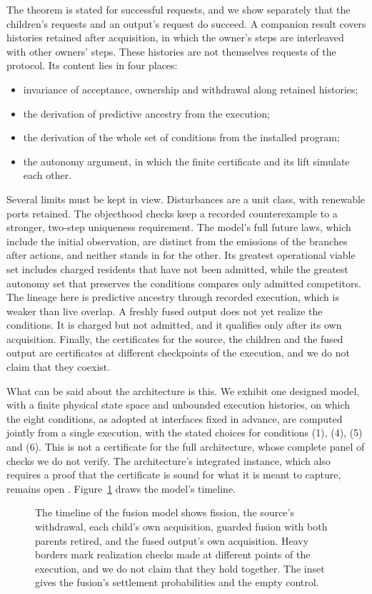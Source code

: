 The theorem is stated for successful requests, and we show separately that the
children's requests and an output's request do succeed. A companion result
covers histories retained after acquisition, in which the owner's steps are
interleaved with other owners' steps. These histories are not themselves
requests of the protocol. Its content lies in
four places:
\begin{itemize}
\item invariance of acceptance, ownership and withdrawal along retained
histories;
\item the derivation of predictive ancestry from the execution;
\item the derivation of the whole set of conditions from the installed
program;
\item the autonomy argument, in which the finite certificate and its lift
simulate each other.
\end{itemize}

Several limits must be kept in view. Disturbances are a unit class, with
renewable ports retained. The objecthood checks keep a recorded counterexample
to a stronger, two-step uniqueness requirement. The model's full future laws,
which include the initial observation, are distinct from the emissions of the
branches after actions, and neither stands in for the other. Its greatest
operational viable set includes charged residents that have not been
admitted, while the greatest autonomy set that preserves the conditions
compares only admitted competitors. The lineage here is predictive ancestry
through recorded execution, which is weaker than live overlap. A freshly fused
output does not yet realize the conditions. It is charged but not admitted,
and it qualifies only after its own acquisition. Finally, the certificates for
the source, the children and the fused output are certificates at different
checkpoints of the execution, and we do not claim that they coexist.

What can be said about the architecture is this. We exhibit one designed
model, with a finite physical state space and unbounded execution histories,
on which the eight conditions, as adopted at interfaces fixed in advance, are
computed jointly from a single execution, with the stated choices for
conditions (1), (4), (5) and (6). This is not a certificate for the full
architecture, whose complete panel of checks we do not verify. The
architecture's integrated instance, which also requires a proof that the
certificate is sound for what it is meant to capture, remains open
\citep{TsiokosArchitecture2026}. Figure~\ref{fig:fusion} draws the model's
timeline.

\begin{figure}[tbp]
\centering

\caption{The timeline of the fusion model shows fission, the source's withdrawal, each child's own acquisition, guarded fusion with both parents retired, and the fused output's own acquisition. Heavy borders mark realization checks made at different points of the execution, and we do not claim that they hold together. The inset gives the fusion's settlement probabilities and the empty control.}
\label{fig:fusion}
\end{figure}

